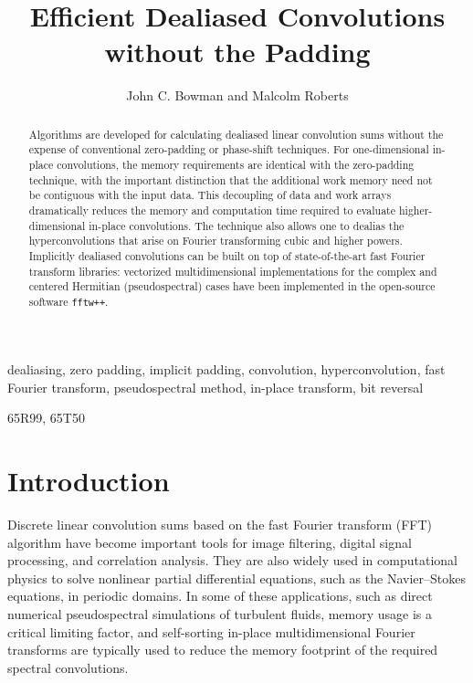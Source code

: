 \documentclass[final]{siamltex}
\begin{document}
\title{Efficient Dealiased Convolutions without the Padding}
\author{John C. Bowman and Malcolm Roberts}
\maketitle

\begin{abstract}
Algorithms are developed for calculating dealiased linear convolution sums
without the expense of conventional zero-padding or phase-shift
techniques. For one-dimensional in-place convolutions, the memory
requirements are identical with the zero-padding technique, with the important
distinction that the additional work memory need not be contiguous with the
input data. This decoupling of data and work arrays dramatically reduces
the memory and computation time required to evaluate higher-dimensional
in-place convolutions. The technique also allows one to dealias the
hyperconvolutions that arise on Fourier transforming cubic and higher powers.
Implicitly dealiased convolutions can be built on top of state-of-the-art
fast Fourier transform libraries: vectorized multidimensional implementations
for the complex and centered Hermitian (pseudospectral) cases have
been implemented in the open-source software {\tt fftw++}.
\end{abstract} 

\begin{keywords} 
dealiasing, zero padding, implicit padding, convolution, hyperconvolution,
fast Fourier transform, pseudospectral method, in-place transform, bit reversal
\end{keywords}

\begin{AMS}
65R99, 65T50
\end{AMS}

\pagestyle{myheadings}



\section{Introduction}
Discrete linear convolution sums based on the fast Fourier transform
(FFT) algorithm \cite{Gauss1866,Cooley65} have become important tools
for image filtering, digital signal processing, and correlation
analysis. They are also widely used in computational physics to solve
nonlinear partial differential equations, such as the Navier--Stokes
equations, in periodic domains. In some of these applications, such as
direct numerical pseudospectral simulations of turbulent fluids,
memory usage is a critical limiting factor, and self-sorting in-place
multidimensional Fourier transforms \cite{Temperton91} are typically used to
reduce the memory footprint of the required spectral convolutions.
\end{document}
